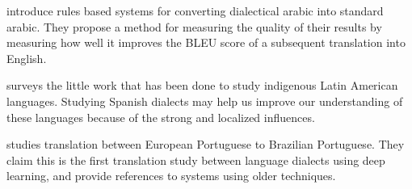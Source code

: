 \documentclass[10pt]{article}
\begin{document}
\citet{salloum2011dialectal,salloum2013dialectal} introduce rules based systems for converting dialectical arabic into standard arabic.
They propose a method for measuring the quality of their results by measuring how well it improves the BLEU score of a subsequent translation into English.

\citet{mager2018challenges} surveys the little work that has been done to study indigenous Latin American languages.
Studying Spanish dialects may help us improve our understanding of these languages because of the strong and localized influences.

\citet{costa2018neural} studies translation between European Portuguese to Brazilian Portuguese.
They claim this is the first translation study between language dialects using deep learning,
and provide references to systems using older techniques.

\small

%

\end{document}
